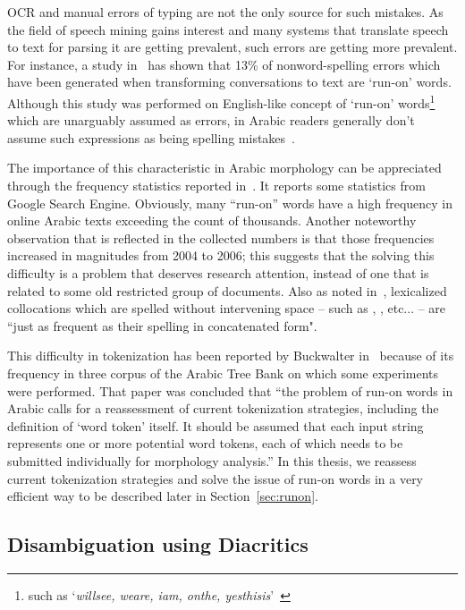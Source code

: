 \documentclass[a4,12pt]{report}
\newcommand{\noVocRL}[1]{\transtrue\novocalize\RL{#1}\vocalize}
\begin{document}
OCR and manual errors of typing are not the only source for such mistakes. As the field
of speech mining gains interest and many systems that translate speech to text for parsing it
are getting prevalent, such errors are getting more prevalent. For instance, a study in~\cite{Kukich:92}
has shown that 13\% of nonword-spelling errors which have been generated when transforming
conversations to text are `run-on' words. Although this study was performed on English-like concept of
`run-on' words\footnote{such as `{\em willsee, weare, iam, onthe, yesthisis}'~\cite{Kukich:92}} 
which are unarguably assumed as errors, in Arabic readers generally don't assume such
expressions as being spelling mistakes~\cite{Buckwalter:04}.

The importance of this characteristic in Arabic morphology can be appreciated 
through the frequency statistics reported in~\cite{Sou07}. It reports some statistics
from Google Search Engine. Obviously, many ``run-on'' words have a high frequency in online 
Arabic texts exceeding the count of thousands. Another noteworthy observation that is reflected
in the collected numbers is that those frequencies increased in magnitudes from 2004 to 2006; this 
suggests that the solving this difficulty is a problem that deserves research attention, instead of 
one that is related to some old restricted group of documents. Also as noted in~\cite{Buckwalter:04},
lexicalized collocations which are spelled without intervening space -- such as \noVocRL{lAyzAl}, 
\noVocRL{lAbod}, etc... -- are ``just as frequent as their spelling in concatenated form".

This difficulty in tokenization has been reported by Buckwalter in~\cite{Buckwalter:04} because of its 
frequency in three corpus of the Arabic Tree Bank on which some experiments were performed. 
That paper was concluded that ``the problem of run-on words in Arabic calls for
a reassessment of current tokenization strategies,
including the definition of `word token' itself. It
should be assumed that each input string represents
one or more potential word tokens, each of which
needs to be submitted individually for morphology
analysis.'' In this thesis, we reassess current tokenization strategies and solve the issue
of run-on words in a very efficient way to be described later in Section~\ref{sec:runon}.

\subsection{Disambiguation using Diacritics}
\end{document}
